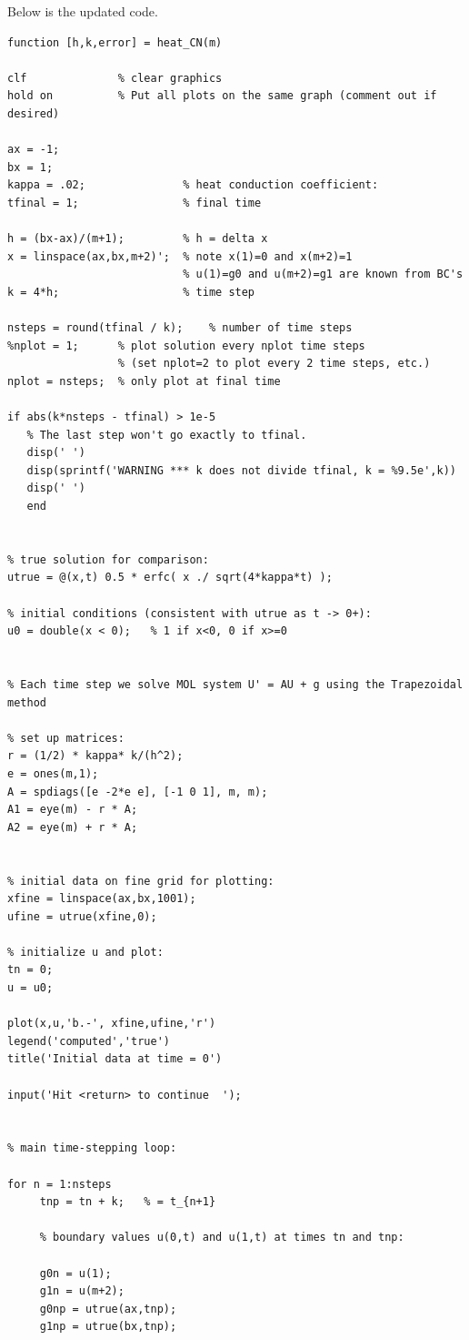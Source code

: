 \documentclass[9pt,oneside,openany]{memoir}
\begin{document}
\begin{solution}
Below is the updated code.


\begin{lstlisting}[style=editor]
function [h,k,error] = heat_CN(m)

clf              % clear graphics
hold on          % Put all plots on the same graph (comment out if desired)

ax = -1;
bx = 1;
kappa = .02;               % heat conduction coefficient:
tfinal = 1;                % final time

h = (bx-ax)/(m+1);         % h = delta x
x = linspace(ax,bx,m+2)';  % note x(1)=0 and x(m+2)=1
                           % u(1)=g0 and u(m+2)=g1 are known from BC's
k = 4*h;                   % time step

nsteps = round(tfinal / k);    % number of time steps
%nplot = 1;      % plot solution every nplot time steps
                 % (set nplot=2 to plot every 2 time steps, etc.)
nplot = nsteps;  % only plot at final time

if abs(k*nsteps - tfinal) > 1e-5
   % The last step won't go exactly to tfinal.
   disp(' ')
   disp(sprintf('WARNING *** k does not divide tfinal, k = %9.5e',k))
   disp(' ')
   end


% true solution for comparison:
utrue = @(x,t) 0.5 * erfc( x ./ sqrt(4*kappa*t) );

% initial conditions (consistent with utrue as t -> 0+):
u0 = double(x < 0);   % 1 if x<0, 0 if x>=0


% Each time step we solve MOL system U' = AU + g using the Trapezoidal method

% set up matrices:
r = (1/2) * kappa* k/(h^2);
e = ones(m,1);
A = spdiags([e -2*e e], [-1 0 1], m, m);
A1 = eye(m) - r * A;
A2 = eye(m) + r * A;


% initial data on fine grid for plotting:
xfine = linspace(ax,bx,1001);
ufine = utrue(xfine,0);

% initialize u and plot:
tn = 0;
u = u0;

plot(x,u,'b.-', xfine,ufine,'r')
legend('computed','true')
title('Initial data at time = 0')

input('Hit <return> to continue  ');


% main time-stepping loop:

for n = 1:nsteps
     tnp = tn + k;   % = t_{n+1}

     % boundary values u(0,t) and u(1,t) at times tn and tnp:

     g0n = u(1);
     g1n = u(m+2);
     g0np = utrue(ax,tnp);
     g1np = utrue(bx,tnp);


\end{lstlisting}
\end{solution}
\end{document}
